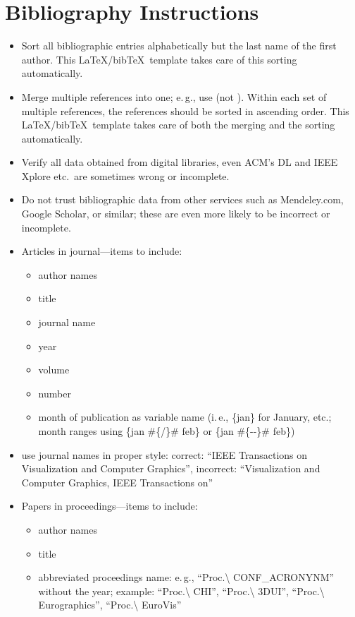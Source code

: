 \documentclass[journal]{vgtc}                %
\begin{document}
\section{Bibliography Instructions}

\begin{itemize}
\item Sort all bibliographic entries alphabetically but the last name of the first author. This \LaTeX/bib\TeX\ template takes care of this sorting automatically.
\item Merge multiple references into one; e.\,g., use \cite{Max:1995:OMF,Kitware:2003} (not \cite{Kitware:2003}\cite{Max:1995:OMF}). Within each set of multiple references, the references should be sorted in ascending order. This \LaTeX/bib\TeX\ template takes care of both the merging and the sorting automatically.
\item Verify all data obtained from digital libraries, even ACM's DL and IEEE Xplore  etc.\ are sometimes wrong or incomplete.
\item Do not trust bibliographic data from other services such as Mendeley.com, Google Scholar, or similar; these are even more likely to be incorrect or incomplete.
\item Articles in journal---items to include:
  \begin{itemize}
  \item author names
	\item title
	\item journal name
	\item year
	\item volume
	\item number
	\item month of publication as variable name (i.\,e., \{jan\} for January, etc.; month ranges using \{jan \#\{/\}\# feb\} or \{jan \#\{-{}-\}\# feb\})
  \end{itemize}
\item use journal names in proper style: correct: ``IEEE Transactions on Visualization and Computer Graphics'', incorrect: ``Visualization and Computer Graphics, IEEE Transactions on''
\item Papers in proceedings---items to include:
  \begin{itemize}
  \item author names
	\item title
	\item abbreviated proceedings name: e.\,g., ``Proc.\textbackslash{} CONF\_ACRONYNM'' without the year; example: ``Proc.\textbackslash{} CHI'', ``Proc.\textbackslash{} 3DUI'', ``Proc.\textbackslash{} Eurographics'', ``Proc.\textbackslash{} EuroVis''

\end{itemize}
\end{itemize}
\end{document}
